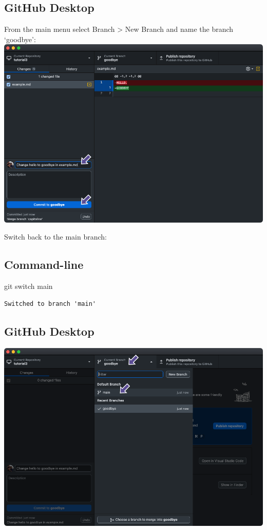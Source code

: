 \documentclass[
  letterpaper,
  DIV=11,
  numbers=noendperiod]{scrartcl}
\newenvironment{Shaded}{\begin{snugshade}}{\end{snugshade}}
\newcommand{\ControlFlowTok}[1]{\textcolor[rgb]{0.00,0.23,0.31}{#1}}
\newcommand{\NormalTok}[1]{\textcolor[rgb]{0.00,0.23,0.31}{#1}}
\begin{document}
\subsection{GitHub Desktop}

From the main menu select Branch \textgreater{} New Branch and name the
branch `goodbye': \includegraphics{images/image59.png}

Switch back to the main branch:

\subsection{Command-line}

\begin{Shaded}
\begin{Highlighting}[]
\NormalTok{git }\ControlFlowTok{switch}\NormalTok{ main}
\end{Highlighting}
\end{Shaded}

\begin{verbatim}
Switched to branch 'main'
\end{verbatim}

\subsection{GitHub Desktop}

\includegraphics{images/image60.png}
\end{document}
